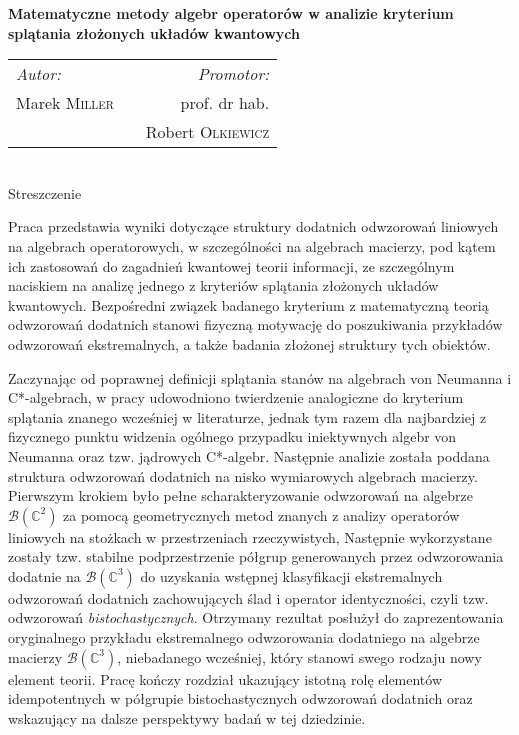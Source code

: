 \thispagestyle{empty}

\begin{center}
{ \large \bfseries
    Matematyczne metody algebr operatorów
    w analizie kryterium splątania
    złożonych układów kwantowych
}\\[1.5cm]

{
\begin{tabular}{lcr}
\emph{Autor:} & \hspace{3cm} & \emph{Promotor:}\\
Marek \textsc{Miller} & & prof. dr hab. \\
    & & Robert \textsc{Olkiewicz}
\end{tabular}
}
\\[1cm]
Streszczenie\\[0.5cm]
\end{center}

{
Praca przedstawia wyniki dotyczące struktury dodatnich odwzorowań liniowych
na algebrach operatorowych, w szczególności na algebrach macierzy,
pod kątem ich zastosowań do zagadnień kwantowej teorii informacji,
ze szczególnym naciskiem na analizę jednego z kryteriów splątania złożonych
układów kwantowych.
Bezpośredni związek badanego kryterium z matematyczną teorią odwzorowań dodatnich
stanowi fizyczną motywację do poszukiwania przykładów odwzorowań ekstremalnych,
a także badania złożonej struktury tych obiektów.

Zaczynając od poprawnej definicji splątania stanów na algebrach von Neumanna
i C*-algebrach,
w pracy udowodniono twierdzenie analogiczne do kryterium splątania
znanego wcześniej w literaturze, jednak tym razem dla najbardziej
z fizycznego punktu widzenia ogólnego przypadku iniektywnych algebr
von Neumanna oraz tzw. jądrowych C*-algebr.
Następnie analizie została poddana struktura odwzorowań dodatnich na
nisko wymiarowych algebrach macierzy.
Pierwszym krokiem było pełne scharakteryzowanie odwzorowań na algebrze
$\mathcal{B}(\mathbb{C}^{2})$ za pomocą geometrycznych metod znanych z analizy
operatorów liniowych na stożkach w przestrzeniach rzeczywistych,
Następnie wykorzystane zostały tzw. stabilne podprzestrzenie półgrup
generowanych przez odwzorowania dodatnie na
$\mathcal{B}(\mathbb{C}^{3})$ do uzyskania
wstępnej klasyfikacji ekstremalnych odwzorowań dodatnich
zachowujących ślad i operator identyczności,
czyli tzw. odwzorowań \emph{bistochastycznych}.
Otrzymany rezultat posłużył do zaprezentowania oryginalnego przykładu
ekstremalnego odwzorowania dodatniego na algebrze macierzy
$\mathcal{B}(\mathbb{C}^{3})$, niebadanego wcześniej,
który stanowi swego rodzaju nowy element teorii.
Pracę kończy rozdział
ukazujący istotną rolę elementów idempotentnych w półgrupie bistochastycznych
odwzorowań dodatnich oraz wskazujący na dalsze perspektywy badań w tej dziedzinie.
}
\vfill
